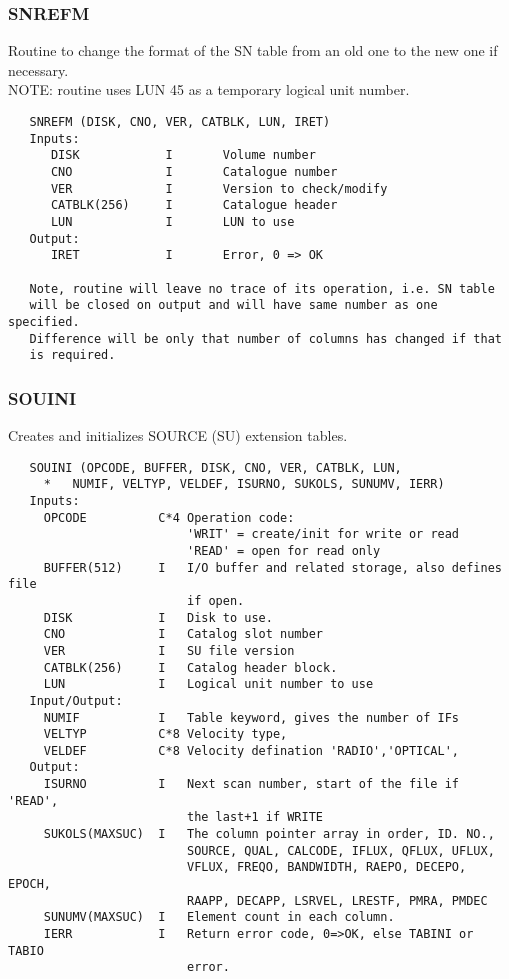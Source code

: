 \subsubsection{SNREFM}
Routine to change the format of the SN table from an old one to the
new one if necessary.\\
NOTE: routine uses LUN 45 as a temporary logical unit number.
\begin{verbatim}
   SNREFM (DISK, CNO, VER, CATBLK, LUN, IRET)
   Inputs:
      DISK            I       Volume number
      CNO             I       Catalogue number
      VER             I       Version to check/modify
      CATBLK(256)     I       Catalogue header
      LUN             I       LUN to use
   Output:
      IRET            I       Error, 0 => OK

   Note, routine will leave no trace of its operation, i.e. SN table
   will be closed on output and will have same number as one specified.
   Difference will be only that number of columns has changed if that
   is required.
\end{verbatim}

\subsubsection{SOUINI}
Creates and initializes SOURCE (SU) extension tables.
\begin{verbatim}
   SOUINI (OPCODE, BUFFER, DISK, CNO, VER, CATBLK, LUN,
     *   NUMIF, VELTYP, VELDEF, ISURNO, SUKOLS, SUNUMV, IERR)
   Inputs:
     OPCODE          C*4 Operation code:
                         'WRIT' = create/init for write or read
                         'READ' = open for read only
     BUFFER(512)     I   I/O buffer and related storage, also defines file
                         if open.
     DISK            I   Disk to use.
     CNO             I   Catalog slot number
     VER             I   SU file version
     CATBLK(256)     I   Catalog header block.
     LUN             I   Logical unit number to use
   Input/Output:
     NUMIF           I   Table keyword, gives the number of IFs
     VELTYP          C*8 Velocity type,
     VELDEF          C*8 Velocity defination 'RADIO','OPTICAL',
   Output:
     ISURNO          I   Next scan number, start of the file if 'READ',
                         the last+1 if WRITE
     SUKOLS(MAXSUC)  I   The column pointer array in order, ID. NO.,
                         SOURCE, QUAL, CALCODE, IFLUX, QFLUX, UFLUX,
                         VFLUX, FREQO, BANDWIDTH, RAEPO, DECEPO, EPOCH,
                         RAAPP, DECAPP, LSRVEL, LRESTF, PMRA, PMDEC
     SUNUMV(MAXSUC)  I   Element count in each column.
     IERR            I   Return error code, 0=>OK, else TABINI or TABIO
                         error.
\end{verbatim}

